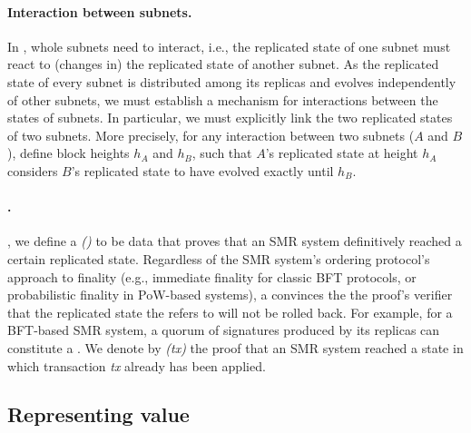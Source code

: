 
\paragraph{Interaction between subnets.}
In \ipc, whole subnets need to interact, i.e., the replicated state of one subnet must react to (changes in) the replicated state of another subnet.
As the replicated state of every subnet is distributed among its replicas and evolves independently of other subnets,
we must establish a mechanism for interactions between the states of subnets.
In particular, we must explicitly link the two replicated states of two subnets.
More precisely, for any interaction between two subnets ($A$ and $B$), define block heights $h_A$ and $h_B$,
such that $A$'s replicated state at height $h_A$ considers $B$'s replicated state to have evolved exactly until $h_B$.

\paragraph{\PofsFull.}, we define a \emph{\pofFull (\pof)} to be data that proves that an SMR system definitively reached a certain replicated state.
Regardless of the SMR system's ordering protocol's approach to finality (e.g., immediate finality for classic BFT protocols, or probabilistic finality in PoW-based systems),
a \pof convinces the the proof's verifier that the replicated state the \pof refers to will not be rolled back.
For example, for a BFT-based SMR system, a quorum of signatures produced by its replicas can constitute a \pof.
We denote by \emph{\pof(tx)} the proof that an SMR system reached a state in which transaction \emph{tx} already has been applied.


\subsection{Representing value}

